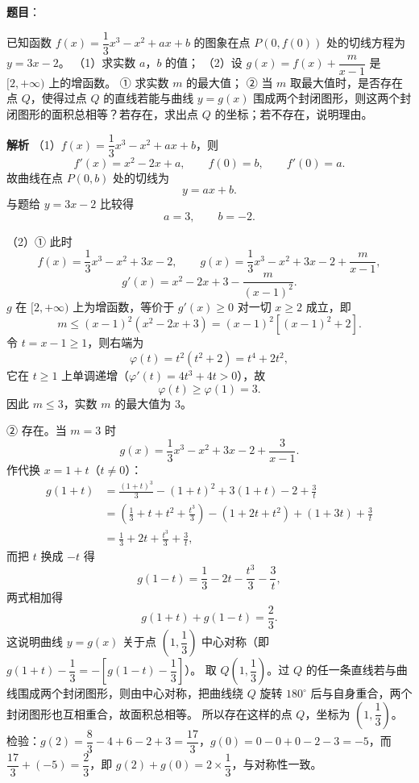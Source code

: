 \begin{answer}

\textbf{题目}：

已知函数 $f(x)=\dfrac13x^3-x^2+ax+b$ 的图象在点 $P(0,f(0))$ 处的切线方程为 $y=3x-2$。
（1）求实数 $a$，$b$ 的值；
（2）设 $g(x)=f(x)+\dfrac{m}{x-1}$ 是 $[2,+\infty)$ 上的增函数。
① 求实数 $m$ 的最大值；
② 当 $m$ 取最大值时，是否存在点 $Q$，使得过点 $Q$ 的直线若能与曲线 $y=g(x)$ 围成两个封闭图形，则这两个封闭图形的面积总相等？若存在，求出点 $Q$ 的坐标；若不存在，说明理由。

\textbf{解析}
（1）$f(x)=\dfrac13x^3-x^2+ax+b$，则
\nopagebreak[4]
\[f'(x)=x^2-2x+a,\qquad f(0)=b,\qquad f'(0)=a.\]
故曲线在点 $P(0,b)$ 处的切线为
\nopagebreak[4]
\[y=ax+b.\]
与题给 $y=3x-2$ 比较得
\nopagebreak[4]
\[a=3,\qquad b=-2.\]

（2）① 此时
\nopagebreak[4]
\[f(x)=\frac13x^3-x^2+3x-2,\qquad g(x)=\frac13x^3-x^2+3x-2+\frac{m}{x-1},\]
\nopagebreak[4]
\[g'(x)=x^2-2x+3-\frac{m}{(x-1)^2}.\]
$g$ 在 $[2,+\infty)$ 上为增函数，等价于 $g'(x)\geqslant0$ 对一切 $x\geqslant2$ 成立，即
\nopagebreak[4]
\[m\leqslant(x-1)^2\left(x^2-2x+3\right)=(x-1)^2\left[(x-1)^2+2\right].\]
令 $t=x-1\geqslant1$，则右端为
\nopagebreak[4]
\[\varphi(t)=t^2\left(t^2+2\right)=t^4+2t^2,\]
它在 $t\geqslant1$ 上单调递增（$\varphi'(t)=4t^3+4t>0$），故
\nopagebreak[4]
\[\varphi(t)\geqslant\varphi(1)=3.\]
因此 $m\leqslant3$，实数 $m$ 的最大值为 $3$。

② 存在。当 $m=3$ 时
\nopagebreak[4]
\[g(x)=\frac13x^3-x^2+3x-2+\frac{3}{x-1}.\]
作代换 $x=1+t$（$t\neq0$）：
\nopagebreak[4]
\[\begin{aligned}
g(1+t)&=\frac{(1+t)^3}{3}-(1+t)^2+3(1+t)-2+\frac{3}{t}\\
&=\left(\frac13+t+t^2+\frac{t^3}{3}\right)-\left(1+2t+t^2\right)+(1+3t)+\frac3t\\
&=\frac13+2t+\frac{t^3}{3}+\frac3t,
\end{aligned}\]
而把 $t$ 换成 $-t$ 得
\nopagebreak[4]
\[g(1-t)=\frac13-2t-\frac{t^3}{3}-\frac3t,\]
两式相加得
\nopagebreak[4]
\[g(1+t)+g(1-t)=\frac23.\]
这说明曲线 $y=g(x)$ 关于点 $\left(1,\dfrac13\right)$ 中心对称（即 $g(1+t)-\dfrac13=-\left[g(1-t)-\dfrac13\right]$）。
取 $Q\left(1,\dfrac13\right)$。过 $Q$ 的任一条直线若与曲线围成两个封闭图形，则由中心对称，把曲线绕 $Q$ 旋转 $180^\circ$ 后与自身重合，两个封闭图形也互相重合，故面积总相等。
所以存在这样的点 $Q$，坐标为 $\left(1,\dfrac13\right)$。
检验：$g(2)=\dfrac83-4+6-2+3=\dfrac{17}{3}$，$g(0)=0-0+0-2-3=-5$，而 $\dfrac{17}{3}+(-5)=\dfrac23$，即 $g(2)+g(0)=2\times\dfrac13$，与对称性一致。


\end{answer}